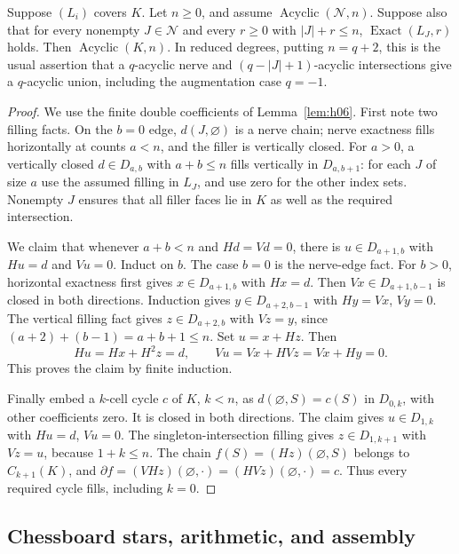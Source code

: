 \begin{lemma}\label{lem:nerve}
Suppose \((L_i)\) covers \(K\). Let \(n\ge0\), and assume
\(\operatorname{Acyclic}(\mathcal N,n)\). Suppose also that for every
nonempty \(J\in\mathcal N\) and every \(r\ge0\) with \(|J|+r\le n\),
\(\operatorname{Exact}(L_J,r)\) holds. Then
\(\operatorname{Acyclic}(K,n)\).
In reduced degrees, putting \(n=q+2\), this is the usual assertion that
a \(q\)-acyclic nerve and \((q-|J|+1)\)-acyclic intersections give a
\(q\)-acyclic union, including the augmentation case \(q=-1\).
\end{lemma}
\begin{proof}
We use the finite double coefficients of Lemma~\ref{lem:h06}.
First note two filling facts. On the \(b=0\) edge, \(d(J,\varnothing)\)
is a nerve chain; nerve exactness fills horizontally at counts \(a<n\),
and the filler is vertically closed. For \(a>0\), a vertically closed
\(d\in D_{a,b}\) with \(a+b\le n\) fills vertically in \(D_{a,b+1}\):
for each \(J\) of size \(a\) use the assumed filling in \(L_J\), and
use zero for the other index sets. Nonempty \(J\) ensures that all filler
faces lie in \(K\) as well as the required intersection.

We claim that whenever \(a+b<n\) and \(Hd=Vd=0\), there is
\(u\in D_{a+1,b}\) with \(Hu=d\) and \(Vu=0\).
Induct on \(b\). The case \(b=0\) is the nerve-edge fact.
For \(b>0\), horizontal exactness first gives \(x\in D_{a+1,b}\)
with \(Hx=d\). Then \(Vx\in D_{a+1,b-1}\) is closed in both directions.
Induction gives \(y\in D_{a+2,b-1}\) with \(Hy=Vx\), \(Vy=0\).
The vertical filling fact gives \(z\in D_{a+2,b}\) with \(Vz=y\),
since \((a+2)+(b-1)=a+b+1\le n\). Set \(u=x+Hz\). Then
\[
 Hu=Hx+H^2z=d,\qquad Vu=Vx+HVz=Vx+Hy=0.
\]
This proves the claim by finite induction.

Finally embed a \(k\)-cell cycle \(c\) of \(K\), \(k<n\), as
\(d(\varnothing,S)=c(S)\) in \(D_{0,k}\), with other coefficients zero.
It is closed in both directions. The claim gives \(u\in D_{1,k}\)
with \(Hu=d\), \(Vu=0\). The singleton-intersection filling gives
\(z\in D_{1,k+1}\) with \(Vz=u\), because \(1+k\le n\).
The chain \(f(S)=(Hz)(\varnothing,S)\) belongs to \(C_{k+1}(K)\), and
\(\partial f=(VHz)(\varnothing,\cdot)=(HVz)(\varnothing,\cdot)=c\).
Thus every required cycle fills, including \(k=0\).
\end{proof}

\subsection{Chessboard stars, arithmetic, and assembly}

